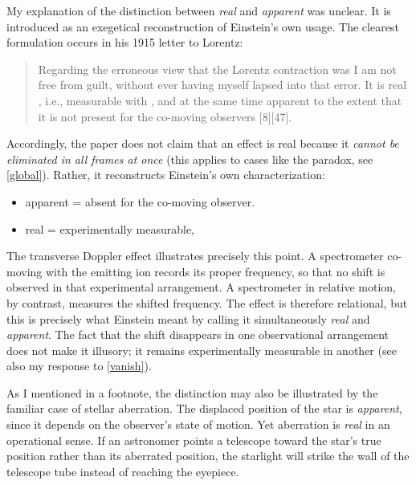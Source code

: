 \documentclass[submitted,11pt]{article}
\begin{document}
\begin{reply}
My explanation of  the distinction between \emph{real} and \emph{apparent} was unclear. It is introduced as an exegetical reconstruction of Einstein's own usage. The clearest formulation occurs in his 1915 letter to Lorentz:

\begin{quote}
Regarding the erroneous view that the Lorentz contraction was   I am not free from guilt, without ever having myself lapsed into that error. It is real , i.e., measurable with \rac, and at the same time apparent  to the extent that it is not present for the co-moving observers [8][47].
\end{quote}
%
Accordingly, the paper does not claim that an effect is real because it \emph{cannot be eliminated in all frames at once} (this applies to cases like the \Ehr paradox, see \ref{global}). Rather, it reconstructs Einstein's own characterization: 


\begin{itemize}
\item apparent = absent for the co-moving observer.
\item real = experimentally measurable,
\end{itemize}
%
The transverse Doppler effect illustrates precisely this point. A spectrometer co-moving with the emitting ion records its proper frequency, so that no shift is observed in that experimental arrangement. A spectrometer in relative motion, by contrast, measures the shifted frequency. The effect is therefore relational, but this is precisely what Einstein meant by calling it simultaneously \emph{real} and \emph{apparent}. The fact that the shift disappears in one observational arrangement does not make it illusory; it remains experimentally measurable in another (see also my response to \ref{vanish}).

As I mentioned in a footnote, the distinction may also be illustrated by the familiar case of stellar aberration. The displaced position of the star is \emph{apparent}, since it depends on the observer's state of motion. Yet aberration is \emph{real} in an operational sense. If an astronomer points a telescope toward the star's true position rather than its aberrated position, the starlight will strike the wall of the telescope tube instead of reaching the eyepiece.
\end{reply}
\end{document}
